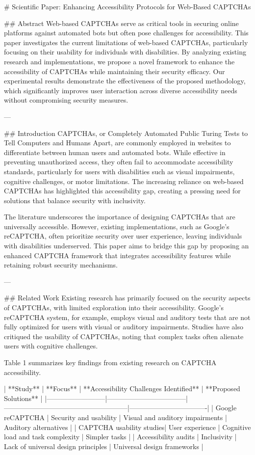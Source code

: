 # Scientific Paper: Enhancing Accessibility Protocols for Web-Based CAPTCHAs

## Abstract
Web-based CAPTCHAs serve as critical tools in securing online platforms against automated bots but often pose challenges for accessibility. This paper investigates the current limitations of web-based CAPTCHAs, particularly focusing on their usability for individuals with disabilities. By analyzing existing research and implementations, we propose a novel framework to enhance the accessibility of CAPTCHAs while maintaining their security efficacy. Our experimental results demonstrate the effectiveness of the proposed methodology, which significantly improves user interaction across diverse accessibility needs without compromising security measures.

---

## Introduction
CAPTCHAs, or Completely Automated Public Turing Tests to Tell Computers and Humans Apart, are commonly employed in websites to differentiate between human users and automated bots. While effective in preventing unauthorized access, they often fail to accommodate accessibility standards, particularly for users with disabilities such as visual impairments, cognitive challenges, or motor limitations. The increasing reliance on web-based CAPTCHAs has highlighted this accessibility gap, creating a pressing need for solutions that balance security with inclusivity.

The literature underscores the importance of designing CAPTCHAs that are universally accessible. However, existing implementations, such as Google's reCAPTCHA, often prioritize security over user experience, leaving individuals with disabilities underserved. This paper aims to bridge this gap by proposing an enhanced CAPTCHA framework that integrates accessibility features while retaining robust security mechanisms.

---

## Related Work
Existing research has primarily focused on the security aspects of CAPTCHAs, with limited exploration into their accessibility. Google's reCAPTCHA system, for example, employs visual and auditory tests that are not fully optimized for users with visual or auditory impairments. Studies have also critiqued the usability of CAPTCHAs, noting that complex tasks often alienate users with cognitive challenges.

Table 1 summarizes key findings from existing research on CAPTCHA accessibility.

| **Study**               | **Focus**                        | **Accessibility Challenges Identified**               | **Proposed Solutions**          |
|--------------------------|-----------------------------------|------------------------------------------------------|----------------------------------|
| Google reCAPTCHA         | Security and usability           | Visual and auditory impairments                      | Auditory alternatives            |
| CAPTCHA usability studies| User experience                 | Cognitive load and task complexity                   | Simpler tasks                    |
| Accessibility audits     | Inclusivity                     | Lack of universal design principles                  | Universal design frameworks      |

